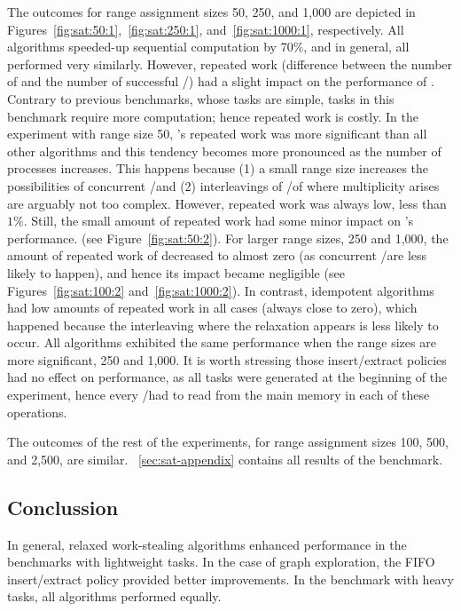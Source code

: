 The outcomes for range assignment sizes 50, 250, and 1,000 are depicted in Figures~\ref{fig:sat:50:1},~\ref{fig:sat:250:1}, and~\ref{fig:sat:1000:1}, respectively.  All algorithms speeded-up sequential computation by 70\%, and in general, all performed very similarly. However, repeated work (difference between the number of \Puts and the number of successful \Takes/\Steals) had a slight impact on the performance of \NCWSM.  Contrary to previous benchmarks, whose tasks are simple, tasks in this benchmark require more computation; hence repeated work is costly. In the experiment with range size 50, \NCWSM's repeated work was more significant than all other algorithms and this tendency becomes more pronounced as the number of processes increases.  This happens because (1) a small range size increases the possibilities of concurrent \Puts/\Takes and (2) interleavings of \Puts/\Takes of \NCWSM where multiplicity arises are arguably not too complex.  However, repeated work was always low, less than $1\%$.  Still, the small amount of repeated work had some minor impact on \NCWSM's performance.  (see Figure~\ref{fig:sat:50:2}).  For larger range sizes, 250 and 1,000, the amount of repeated work of \NCWSM decreased to almost zero (as concurrent \Puts/\Takes are less likely to happen), and hence its impact became negligible (see Figures~\ref{fig:sat:100:2} and~\ref{fig:sat:1000:2}).  In contrast, idempotent algorithms had low amounts of repeated work in all cases (always close to zero), which happened because the interleaving where the relaxation appears is less likely to occur.  All algorithms exhibited the same performance when the range sizes are more significant, 250 and 1,000.  It is worth stressing those insert/extract policies had no effect on performance, as all tasks were generated at the beginning of the experiment, hence every \Take/\Steal had to read from the main memory in each of these operations.

The outcomes of the rest of the experiments, for range assignment sizes 100, 500, and 2,500, are similar.  ~\ref{sec:sat-appendix} contains all results of the benchmark.



\subsection{\label{sec:experiment-conclussions} Conclussion}

In general, relaxed work-stealing algorithms enhanced performance in the benchmarks with lightweight tasks. In the case of graph exploration, the FIFO insert/extract policy provided better improvements.  In the benchmark with heavy tasks, all algorithms performed equally.
